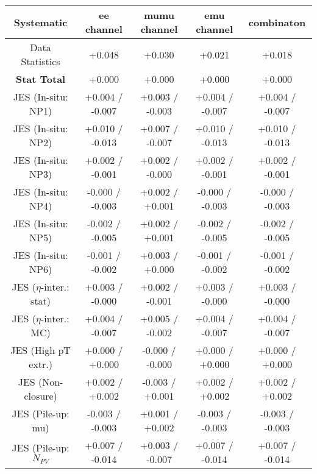 \begin{table}[htbp]
\scriptsize
  \begin{center} 
  \begin{tabular}{|c|c|c|c|c|}
  \hline
Systematic                            &  ee channel&  mumu channel&  emu channel&  combinaton\\
  \hline
Data Statistics                       &+0.048              & +0.030              & +0.021              & +0.018             \\
\hline
\textbf{Stat Total}                   &+0.000              & +0.000              & +0.000              & +0.000             \\
\hline
JES (In-situ: NP1)                    &+0.004   / -0.007   & +0.003   / -0.003   & +0.004   / -0.007   & +0.004   / -0.007  \\
JES (In-situ: NP2)                    &+0.010   / -0.013   & +0.007   / -0.007   & +0.010   / -0.013   & +0.010   / -0.013  \\
JES (In-situ: NP3)                    &+0.002   / -0.001   & +0.002   / -0.000   & +0.002   / -0.001   & +0.002   / -0.001  \\
JES (In-situ: NP4)                    &-0.000   / -0.003   & +0.002   / +0.001   & -0.000   / -0.003   & -0.000   / -0.003  \\
JES (In-situ: NP5)                    &-0.002   / -0.005   & +0.002   / +0.001   & -0.002   / -0.005   & -0.002   / -0.005  \\
JES (In-situ: NP6)                    &-0.001   / -0.002   & +0.003   / +0.000   & -0.001   / -0.002   & -0.001   / -0.002  \\
JES ($\eta$-inter.: stat)               &+0.003   / -0.000   & +0.002   / -0.001   & +0.003   / -0.000   & +0.003   / -0.000  \\
JES ($\eta$-inter.: MC)                 &+0.004   / -0.007   & +0.005   / -0.002   & +0.004   / -0.007   & +0.004   / -0.007  \\
JES (High pT extr.)                  &+0.000   / +0.000   & -0.000   / -0.000   & +0.000   / +0.000   & +0.000   / +0.000  \\
JES (Non-closure)                     &+0.002   / +0.002   & -0.003   / +0.001   & +0.002   / +0.002   & +0.002   / +0.002  \\
JES (Pile-up: mu)                     &-0.003   / -0.003   & +0.001   / +0.002   & -0.003   / -0.003   & -0.003   / -0.003  \\
JES (Pile-up: $N_{PV}$                  &+0.007   / -0.014   & +0.003   / -0.007   & +0.007   / -0.014   & +0.007   / -0.014  \\

\end{tabular}
\end{center}
\end{table}
